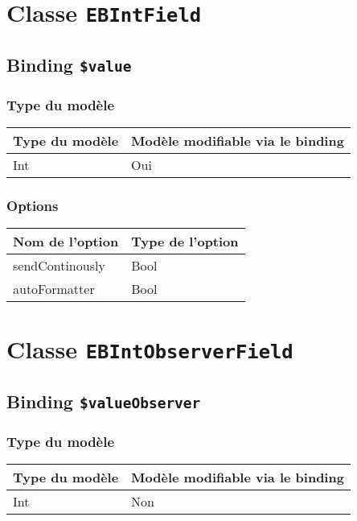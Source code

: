 \section{Classe \texttt{EBIntField}}

\subsection{Binding \texttt{\$value}}

\subsubsection{Type du modèle}

\begin{tabular}{|l|l|}
\hline
\textbf{Type du modèle} & \textbf{Modèle modifiable via le binding}\\
\hline
Int & Oui\\
\hline
\end{tabular}
\subsubsection{Options}

\begin{tabular}{|l|l|}
\hline
\textbf{Nom de l'option} & \textbf{Type de l'option}\\
\hline
sendContinously & Bool\\
\hline
autoFormatter & Bool\\
\hline
\end{tabular}







\section{Classe \texttt{EBIntObserverField}}

\subsection{Binding \texttt{\$valueObserver}}

\subsubsection{Type du modèle}

\begin{tabular}{|l|l|}
\hline
\textbf{Type du modèle} & \textbf{Modèle modifiable via le binding}\\
\hline
Int & Non\\
\hline
\end{tabular}
